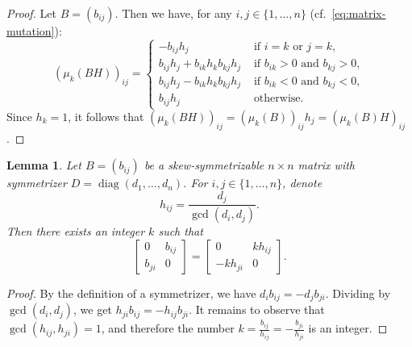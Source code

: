 \documentclass[10pt]{amsart}
\newtheorem{lemma}[theorem]{Lemma}
\theoremstyle{definition}
\DeclareMathOperator{\diag}{diag}
\begin{document}
\begin{proof}
Let $B=(b_{ij})$. Then we have, for any $i,j\in\{1,\dots,n\}$ (cf.~\eqref{eq:matrix-mutation}): 
\[
(\mu_k(BH))_{ij}=\begin{cases} -b_{ij}h_j &\text{ if }i=k\text{ or }j=k, \\
b_{ij}h_j+b_{ik}h_k b_{kj} h_j &\text{ if }b_{ik}>0\text{ and }b_{kj}>0,\\
b_{ij}h_j-b_{ik}h_k b_{kj} h_j&\text{ if }b_{ik}<0\text{ and }b_{kj}<0,\\ 
b_{ij}h_j &\text{ otherwise.} 
\end{cases}
\] 
Since $h_k=1$, it follows that $(\mu_k(BH))_{ij}=(\mu_k(B))_{ij}h_j=(\mu_k(B)H)_{ij}$. 
\end{proof}


\begin{lemma}
\label{lem:bij-divisible}
Let $B=(b_{ij})$ be a skew-symmetrizable $n\times n$ matrix with symmetrizer $D=\diag (d_1,\dots,d_n)$. 
For $i,j\in\{1,\dots,n\}$, denote
\begin{equation}
\label{eq:hij}
h_{ij}=\frac{d_j}{\gcd(d_i,d_j)} .
\end{equation}
Then %
there exists an integer $k$ such that 
\[
\begin{bmatrix}
0 & b_{ij} \\
b_{ji} & 0
\end{bmatrix}
= \begin{bmatrix}
0 & kh_{ij} \\
-kh_{ji} & 0
\end{bmatrix} .
\]
\end{lemma}

\begin{proof}
By the definition of a symmetrizer, we have $d_i b_{ij}=-d_j b_{ji}$. Dividing by $\gcd(d_i,d_j)$, we get $h_{ji} b_{ij}=-h_{ij} b_{ji}$.
It remains to observe that $\gcd(h_{ij},h_{ji})=1$, and therefore the number 
$k=\frac{b_{ij}}{h_{ij}}=-\frac{b_{ji}}{h_{ji}}$ 
 is an integer. 
\end{proof}
\end{document}
